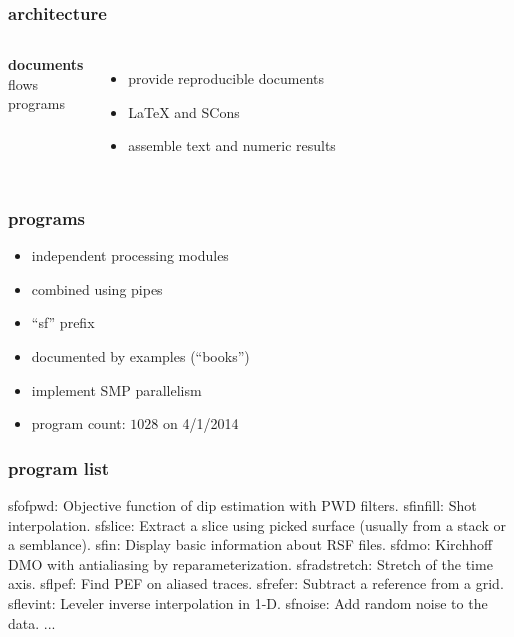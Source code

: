 \begin{frame} \frametitle{\mg architecture}

  \begin{columns}
    \textbf{documents} \\
    \vspace{0.25in}
    flows \\
    \vspace{0.25in}
    programs
    
    \begin{itemize}
    \item provide reproducible documents
    \item \LaTeX\; and SCons
    \item assemble text and numeric results
    \end{itemize}
    
  \end{columns}
  
\end{frame}
\cwpnote{}


\begin{frame} \frametitle{programs}

  \begin{itemize}
  \item independent processing modules
  \item combined using pipes
  \item ``sf'' prefix
  \item documented by examples (``books'')
  \item implement SMP parallelism
  \item program count: $1028$ on 4/1/2014
  \end{itemize}
  
\end{frame}
\cwpnote{}

\begin{frame}[fragile] \frametitle{program list}
  

  \tiny
  \begin{semiverbatim}
    sfofpwd: Objective function of dip estimation with PWD filters.
    sfinfill: Shot interpolation.
    sfslice: Extract a slice using picked surface (usually from a stack or a semblance).
    sfin: Display basic information about RSF files.
    sfdmo: Kirchhoff DMO with antialiasing by reparameterization.
    sfradstretch: Stretch of the time axis.
    sflpef: Find PEF on aliased traces.
    sfrefer: Subtract a reference from a grid.
    sflevint: Leveler inverse interpolation in 1-D.
    sfnoise: Add random noise to the data.
    ...
  \end{semiverbatim}

\end{frame}
\cwpnote{}

